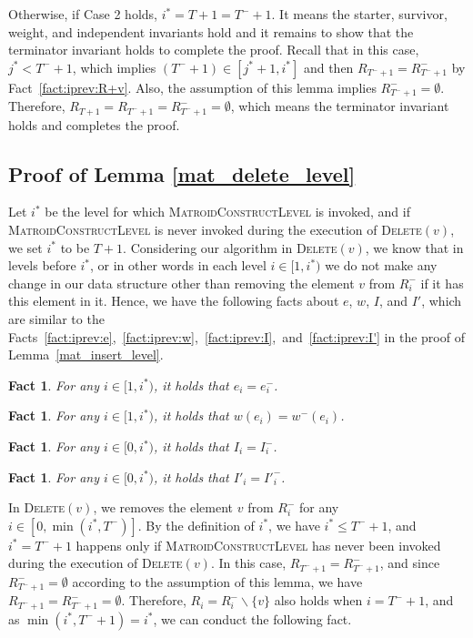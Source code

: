 \documentclass[11pt]{article}
\newtheorem{fact}[theorem]{Fact}
\newcommand{\MatroidConstLevel}{\textsc{MatroidConstructLevel}}
\newcommand{\deletev}{{\textsc{Delete}}}
\begin{document}
Otherwise, if Case 2 holds, $i^*=T+1=T^-+1$.
It means the starter,  survivor, weight, and independent invariants hold and it remains to show that the terminator invariant holds to complete the proof.
Recall that in this case, $j^*<T^-+1$, which implies $(T^-+1)\in[j^*+1, i^*]$ and then $R_{T^-+1}=R_{T^-+1}^-$ by Fact~\ref{fact:iprev:R+v}.
Also, the assumption of this lemma implies $R_{T^-+1}^-=\emptyset$.  Therefore,
$R_{T+1}=R_{T^-+1}=R_{T^-+1}^-=\emptyset$, which means the terminator invariant holds and completes the proof.

\subsection{Proof of Lemma \ref {mat_delete_level}}
\label{subs:mat_delete_level}

Let $i^*$ be the level for which \MatroidConstLevel{} is invoked, and if \MatroidConstLevel{} is never invoked during the execution of \deletev$(v)$, we set $i^*$ to be $T + 1$.
Considering our algorithm in \deletev$(v)$, we know that in levels before $i^*$, or in other words in each level $i \in [1, i^*)$ we do not make any change in our data structure other than removing the element $v$ from $R_{i}^-$ if it has this element in it. 
Hence, we have the following facts about $e$, $w$, $I$, and $I'$, which are similar to the Facts~\ref{fact:iprev:e},~\ref{fact:iprev:w},~\ref{fact:iprev:I},~and~\ref{fact:iprev:I'} in the proof of Lemma~\ref{mat_insert_level}.

\begin{fact}
\label{fact:prev:e}
For any $i \in [1, i^*)$, it holds that $e_i = e_i^-$. 
\end{fact}

\begin{fact}
\label{fact:prev:w}
For any $i \in [1, i^*)$, it holds that $w(e_i) = w^-(e_i)$.
\end{fact}

\begin{fact}
\label{fact:prev:I}
For any $i \in [0, i^*)$, it holds that $I_i = I_i^-$.
\end{fact}

\begin{fact}
\label{fact:prev:I'}
For any $i \in [0, i^*)$, it holds that ${I'}_i =  {I'}_i^-$.
\end{fact}

In \deletev$(v)$, we removes the element $v$ from $R_{i}^-$ for any $i\in[0,\min(i^*,T^-)]$.
By the definition of $i^*$, we have $i^*\leq T^-+1$, and $i^*=T^-+1$ happens only if \MatroidConstLevel{} has never been invoked during the execution of \deletev$(v)$. In this case, 
$R_{T^-+1} = R_{T^-+1}^-$, and since $R_{T^-+1}^- = \emptyset$ according to the assumption of this lemma, we have $R_{T^-+1} = R_{T^-+1}^-=\emptyset$.
Therefore, $R_i = R_i^- \backslash \{v\}$ also holds when $i=T^-+1$, and as $\min(i^*,T^-+1)=i^*$, we can conduct the following fact.
\end{document}
